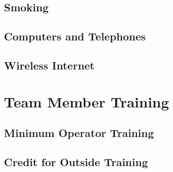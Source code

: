 \documentclass[pdflatex,letterpaper,twoside,12pt]{book}
\begin{document}
\section{Smoking}


\section{Computers and Telephones}


\section{Wireless Internet}


\chapter{Team Member Training}

\section{Minimum Operator Training}


\section{Credit for Outside Training}

\end{document}
